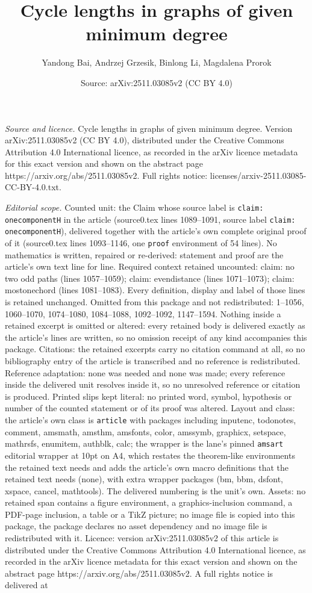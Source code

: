 \documentclass[10pt,a4paper]{amsart}
\title[Cycle lengths in graphs of given minimum degree]{Cycle lengths in graphs of given minimum degree}
\author{Yandong Bai, Andrzej Grzesik, Binlong Li, Magdalena Prorok}
\date{Source: arXiv:2511.03085v2 (CC BY 4.0)}
\begin{document}
\maketitle

\noindent\emph{Source and licence.} Cycle lengths in graphs of given minimum degree. Version arXiv:2511.03085v2 (CC BY 4.0), distributed under the Creative Commons Attribution 4.0 International licence, as recorded in the arXiv licence metadata for this exact version and shown on the abstract page https://arxiv.org/abs/2511.03085v2. Full rights notice: licenses/arxiv-2511.03085-CC-BY-4.0.txt.\par\smallskip

\noindent\textit{Editorial scope.} Counted unit: the Claim whose source label is \texttt{claim: onecomponentH} in the article (source0.tex lines 1089--1091, source label \texttt{claim: onecomponentH}), delivered together with the article's own complete original proof of it (source0.tex lines 1093--1146, one \texttt{proof} environment of 54 lines). No mathematics is written, repaired or re-derived: statement and proof are the article's own text line for line. Required context retained uncounted: claim: no two odd paths (lines 1057--1059); claim: evendistance (lines 1071--1073); claim: mostonechord (lines 1081--1083). Every definition, display and label of those lines is retained unchanged. Omitted from this package and not redistributed: 1--1056, 1060--1070, 1074--1080, 1084--1088, 1092--1092, 1147--1594. Nothing inside a retained excerpt is omitted or altered: every retained body is delivered exactly as the article's lines are written, so no omission receipt of any kind accompanies this package. Citations: the retained excerpts carry no citation command at all, so no bibliography entry of the article is transcribed and no reference is redistributed. Reference adaptation: none was needed and none was made; every reference inside the delivered unit resolves inside it, so no unresolved reference or citation is produced. Printed slips kept literal: no printed word, symbol, hypothesis or number of the counted statement or of its proof was altered. Layout and class: the article's own class is \texttt{article} with packages including inputenc, todonotes, comment, amsmath, amsthm, amsfonts, color, amssymb, graphicx, setspace, mathrsfs, enumitem, authblk, calc; the wrapper is the lane's pinned \texttt{amsart} editorial wrapper at 10pt on A4, which restates the theorem-like environments the retained text needs and adds the article's own macro definitions that the retained text needs (none), with extra wrapper packages (bm, bbm, dsfont, xspace, cancel, mathtools). The delivered numbering is the unit's own. Assets: no retained span contains a figure environment, a graphics-inclusion command, a PDF-page inclusion, a table or a TikZ picture; no image file is copied into this package, the package declares no asset dependency and no image file is redistributed with it. Licence: version arXiv:2511.03085v2 of this article is distributed under the Creative Commons Attribution 4.0 International licence, as recorded in the arXiv licence metadata for this exact version and shown on the abstract page https://arxiv.org/abs/2511.03085v2. A full rights notice is delivered at 
\end{document}
